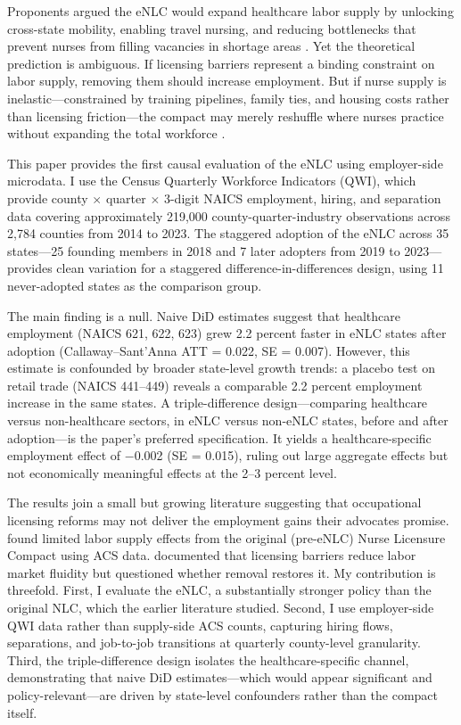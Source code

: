 \documentclass[12pt]{article}
\begin{document}
Proponents argued the eNLC would expand healthcare labor supply by unlocking cross-state mobility, enabling travel nursing, and reducing bottlenecks that prevent nurses from filling vacancies in shortage areas \citep{ncsbn2018enlc}. Yet the theoretical prediction is ambiguous. If licensing barriers represent a binding constraint on labor supply, removing them should increase employment. But if nurse supply is inelastic---constrained by training pipelines, family ties, and housing costs rather than licensing friction---the compact may merely reshuffle where nurses practice without expanding the total workforce \citep{depasquale2016nbc, johnson2018licensure}.

This paper provides the first causal evaluation of the eNLC using employer-side microdata. I use the Census Quarterly Workforce Indicators (QWI), which provide county $\times$ quarter $\times$ 3-digit NAICS employment, hiring, and separation data covering approximately 219,000 county-quarter-industry observations across 2,784 counties from 2014 to 2023. The staggered adoption of the eNLC across 35 states---25 founding members in 2018 and 7 later adopters from 2019 to 2023---provides clean variation for a \citet{callaway2021difference} staggered difference-in-differences design, using 11 never-adopted states as the comparison group.

The main finding is a null. Naive DiD estimates suggest that healthcare employment (NAICS 621, 622, 623) grew 2.2 percent faster in eNLC states after adoption (Callaway--Sant'Anna ATT = 0.022, SE = 0.007). However, this estimate is confounded by broader state-level growth trends: a placebo test on retail trade (NAICS 441--449) reveals a comparable 2.2 percent employment increase in the same states. A triple-difference design---comparing healthcare versus non-healthcare sectors, in eNLC versus non-eNLC states, before and after adoption---is the paper's preferred specification. It yields a healthcare-specific employment effect of $-$0.002 (SE = 0.015), ruling out large aggregate effects but not economically meaningful effects at the 2--3 percent level.

The results join a small but growing literature suggesting that occupational licensing reforms may not deliver the employment gains their advocates promise. \citet{depasquale2016nbc} found limited labor supply effects from the original (pre-eNLC) Nurse Licensure Compact using ACS data. \citet{kleiner2016occupational} documented that licensing barriers reduce labor market fluidity but questioned whether removal restores it. My contribution is threefold. First, I evaluate the eNLC, a substantially stronger policy than the original NLC, which the earlier literature studied. Second, I use employer-side QWI data rather than supply-side ACS counts, capturing hiring flows, separations, and job-to-job transitions at quarterly county-level granularity. Third, the triple-difference design isolates the healthcare-specific channel, demonstrating that naive DiD estimates---which would appear significant and policy-relevant---are driven by state-level confounders rather than the compact itself.
\end{document}
